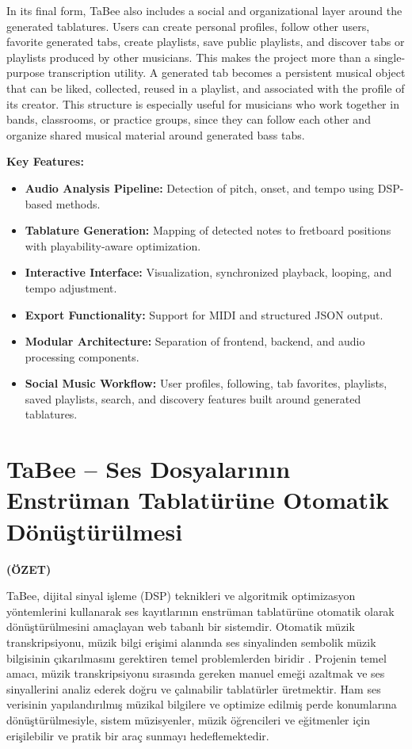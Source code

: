 \documentclass[a4paper, 12pt, titlepage]{article}
\newcommand{\theturkishtitle}{TaBee – Ses Dosyalarının Enstrüman Tablatürüne Otomatik Dönüştürülmesi}
\begin{document}
In its final form, TaBee also includes a social and organizational layer around the generated tablatures. Users can create personal profiles, follow other users, favorite generated tabs, create playlists, save public playlists, and discover tabs or playlists produced by other musicians. This makes the project more than a single-purpose transcription utility. A generated tab becomes a persistent musical object that can be liked, collected, reused in a playlist, and associated with the profile of its creator. This structure is especially useful for musicians who work together in bands, classrooms, or practice groups, since they can follow each other and organize shared musical material around generated bass tabs.

\textbf{Key Features:}
\begin{itemize}
    \item \textbf{Audio Analysis Pipeline:} Detection of pitch, onset, and tempo using DSP-based methods.
    \item \textbf{Tablature Generation:} Mapping of detected notes to fretboard positions with playability-aware optimization.
    \item \textbf{Interactive Interface:} Visualization, synchronized playback, looping, and tempo adjustment.
    \item \textbf{Export Functionality:} Support for MIDI and structured JSON output.
    \item \textbf{Modular Architecture:} Separation of frontend, backend, and audio processing components.
    \item \textbf{Social Music Workflow:} User profiles, following, tab favorites, playlists, saved playlists, search, and discovery features built around generated tablatures.
\end{itemize}

\newpage
\section*{\centering\theturkishtitle}
\centerline{\fontsize{16pt}{21.6pt}\sffamily\bfseries (ÖZET)}
TaBee, dijital sinyal işleme (DSP) teknikleri ve algoritmik optimizasyon yöntemlerini kullanarak ses kayıtlarının enstrüman tablatürüne otomatik olarak dönüştürülmesini amaçlayan web tabanlı bir sistemdir. Otomatik müzik transkripsiyonu, müzik bilgi erişimi alanında ses sinyalinden sembolik müzik bilgisinin çıkarılmasını gerektiren temel problemlerden biridir \cite{klapuri2004,benetos2013}. Projenin temel amacı, müzik transkripsiyonu sırasında gereken manuel emeği azaltmak ve ses sinyallerini analiz ederek doğru ve çalınabilir tablatürler üretmektir. Ham ses verisinin yapılandırılmış müzikal bilgilere ve optimize edilmiş perde konumlarına dönüştürülmesiyle, sistem müzisyenler, müzik öğrencileri ve eğitmenler için erişilebilir ve pratik bir araç sunmayı hedeflemektedir.
\end{document}
